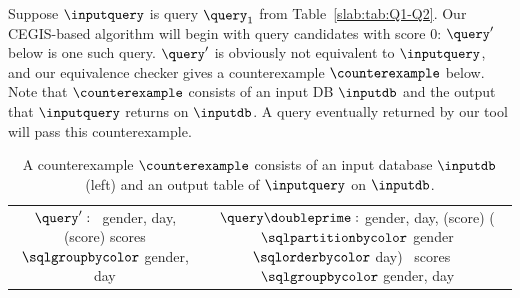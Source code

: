 \begin{example}
Suppose $\inputquery$ is query $\query_1$ from Table~\ref{slab:tab:Q1-Q2}. 
Our CEGIS-based algorithm will begin with query candidates with score 0: $\query'$ below is one such query. 
$\query'$ is obviously not equivalent to $\inputquery$, and our equivalence checker gives a counterexample $\counterexample$ below. Note that $\counterexample$ consists of an input DB $\inputdb$ and the output that $\inputquery$ returns on $\inputdb$. 
A query eventually returned by our tool will pass this counterexample. 



\begin{table}[H]
\footnotesize
\caption*{A counterexample $\counterexample$ consists of an input database $\inputdb$ (left) and an output table of $\inputquery$ on $\inputdb$.}
\vspace{-7pt}
\hspace*{-5pt}
\begin{tabular}{cc}
\makecell[l]{ $\query': $ \ \sqlselectcolor gender, day, \\  
\hspace{42pt} \sqlsumcolor(score) 
  \\ \hspace{2em} \sqlfromcolor scores
  \\ \hspace{2em} $\sqlgroupbycolor$ gender, day}
  &
\makecell[l]{ $\query\doubleprime: $ \sqlselectcolor gender, day, \\
\hspace{5.3em} \sqlsumcolor(score) \\  \hspace{5.3em} \sqlovercolor ($\sqlpartitionbycolor$ gender \\ \hspace{7.9em} $\sqlorderbycolor$ day)\\
 \hspace{2em}  \  \sqlfromcolor scores \\ \hspace{2em} \  $\sqlgroupbycolor$ gender, day}
\end{tabular}
\vspace{-12pt}
\end{table}




\end{example}
